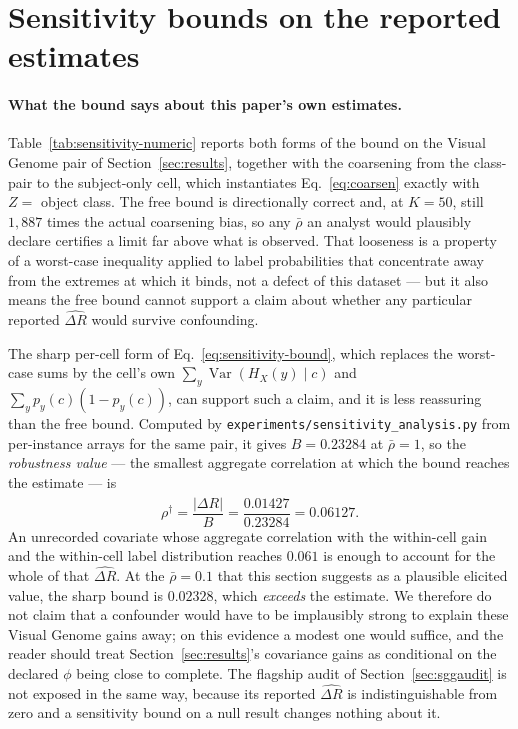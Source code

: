 \section{Sensitivity bounds on the reported estimates}\label{app:sensitivity}

\paragraph{What the bound says about this paper's own estimates.}
Table~\ref{tab:sensitivity-numeric} reports both forms of the bound on the Visual Genome
pair of Section~\ref{sec:results}, together with the coarsening from the class-pair to
the subject-only cell, which instantiates Eq.~\eqref{eq:coarsen} exactly with
$Z=$ object class. The free bound is directionally correct and, at $K=50$, still
$1{,}887$ times the actual coarsening bias, so any $\bar\rho$ an analyst would plausibly
declare certifies a limit far above what is observed. That looseness is a property of a
worst-case inequality applied to label probabilities that concentrate away from the
extremes at which it binds, not a defect of this dataset --- but it also means the free
bound cannot support a claim about whether any particular reported $\widehat{\Delta R}$
would survive confounding.

The sharp per-cell form of Eq.~\eqref{eq:sensitivity-bound}, which replaces the
worst-case sums by the cell's own $\sum_y\operatorname{Var}(H_X(y)\mid c)$ and
$\sum_yp_y(c)(1-p_y(c))$, can support such a claim, and it is less reassuring than the
free bound. Computed by \texttt{experiments/sensitivity\_analysis.py} from per-instance
arrays for the same pair, it gives $B=0.23284$ at $\bar\rho=1$, so the
\emph{robustness value} --- the smallest aggregate correlation at which the bound reaches
the estimate --- is
\begin{equation}
\rho^\dagger=\frac{\bigl|\widehat{\Delta R}\bigr|}{B}
=\frac{0.01427}{0.23284}=0.06127 .
\label{eq:robustness-value}
\end{equation}
An unrecorded covariate whose aggregate correlation with the within-cell gain and the
within-cell label distribution reaches $0.061$ is enough to account for the whole of that
$\widehat{\Delta R}$. At the $\bar\rho=0.1$ that this section suggests as a plausible
elicited value, the sharp bound is $0.02328$, which \emph{exceeds} the estimate. We
therefore do not claim that a confounder would have to be implausibly strong to explain
these Visual Genome gains away; on this evidence a modest one would suffice, and the
reader should treat Section~\ref{sec:results}'s covariance gains as conditional on the
declared $\phi$ being close to complete. The flagship audit of
Section~\ref{sec:sggaudit} is not exposed in the same way, because its reported
$\widehat{\Delta R}$ is indistinguishable from zero and a sensitivity bound on a null
result changes nothing about it.

